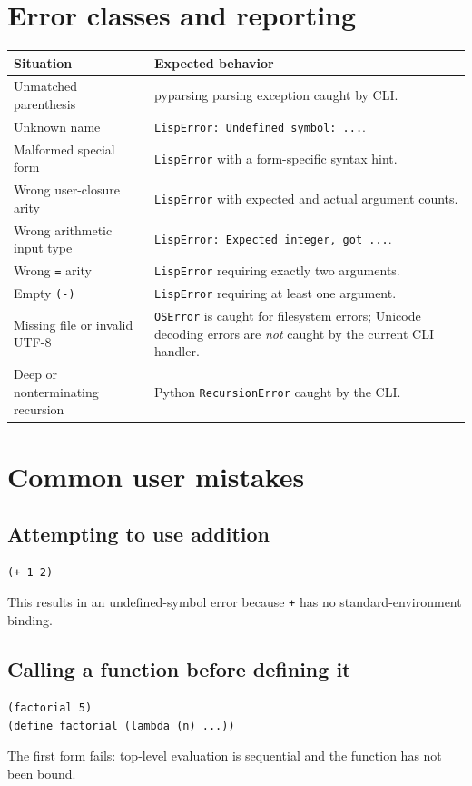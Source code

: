 \documentclass[11pt,a4paper,oneside]{report}
\begin{document}
\section{Error classes and reporting}
\begin{longtable}{p{}p{}}\toprule Situation & Expected behavior\\\midrule\endhead
Unmatched parenthesis & pyparsing parsing exception caught by CLI.\\
Unknown name & \texttt{LispError: Undefined symbol: ...}.\\
Malformed special form & \texttt{LispError} with a form-specific syntax hint.\\
Wrong user-closure arity & \texttt{LispError} with expected and actual argument counts.\\
Wrong arithmetic input type & \texttt{LispError: Expected integer, got ...}.\\
Wrong \texttt{=} arity & \texttt{LispError} requiring exactly two arguments.\\
Empty \texttt{(-)} & \texttt{LispError} requiring at least one argument.\\
Missing file or invalid UTF-8 & \texttt{OSError} is caught for filesystem errors; Unicode decoding errors are \emph{not} caught by the current CLI handler.\\
Deep or nonterminating recursion & Python \texttt{RecursionError} caught by the CLI.\\\bottomrule
\end{longtable}
\section{Common user mistakes}
\subsection{Attempting to use addition}
\begin{lstlisting}
(+ 1 2)
\end{lstlisting}
This results in an undefined-symbol error because \texttt{+} has no standard-environment binding.
\subsection{Calling a function before defining it}
\begin{lstlisting}
(factorial 5)
(define factorial (lambda (n) ...))
\end{lstlisting}
The first form fails: top-level evaluation is sequential and the function has not been bound.
\end{document}
